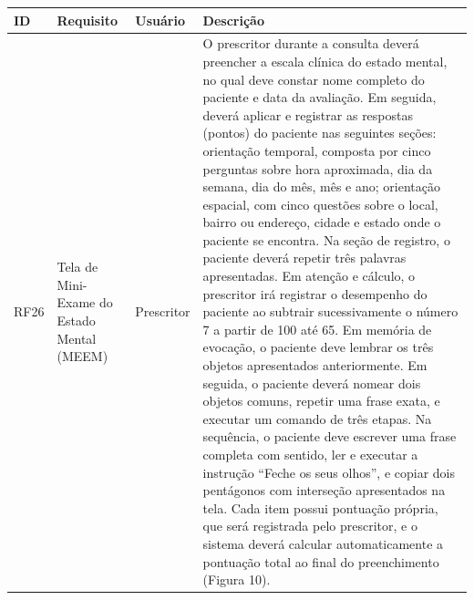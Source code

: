 \href{}{}\documentclass[12pt,portuguese,oneside]{article}
\begin{document}
\begin{table}[H]
\centering
{}
\begin{tabularx}{\textwidth}{|>{\raggedright\arraybackslash}p{1cm}|>{\raggedright\arraybackslash}p{3cm}|>{\raggedright\arraybackslash}p{2cm}|>{\raggedright\arraybackslash}X|}
\hline
\rowcolor{gray!20}
\textbf{ID} & \textbf{Requisito} & \textbf{Usuário} & \textbf{Descrição}\\
\hline
RF26 & Tela de Mini-Exame do Estado Mental (MEEM) & Prescritor &
O prescritor durante a consulta deverá preencher a escala clínica do estado mental, no qual deve constar nome completo do paciente e data da avaliação. Em seguida, deverá aplicar e registrar as respostas (pontos) do paciente nas seguintes seções: orientação temporal, composta por cinco perguntas sobre hora aproximada, dia da semana, dia do mês, mês e ano; orientação espacial, com cinco questões sobre o local, bairro ou endereço, cidade e estado onde o paciente se encontra. Na seção de registro, o paciente deverá repetir três palavras apresentadas. Em atenção e cálculo, o prescritor irá registrar o desempenho do paciente ao subtrair sucessivamente o número 7 a partir de 100 até 65. Em memória de evocação, o paciente deve lembrar os três objetos apresentados anteriormente. Em seguida, o paciente deverá nomear dois objetos comuns, repetir uma frase exata, e executar um comando de três etapas. Na sequência, o paciente deve escrever uma frase completa com sentido, ler e executar a instrução “Feche os seus olhos”, e copiar dois pentágonos com interseção apresentados na tela. Cada item possui pontuação própria, que será registrada pelo prescritor, e o sistema deverá calcular automaticamente a pontuação total ao final do preenchimento (Figura 10).\\
\hline
\end{tabularx}
\end{table}

\newpage
\end{document}
